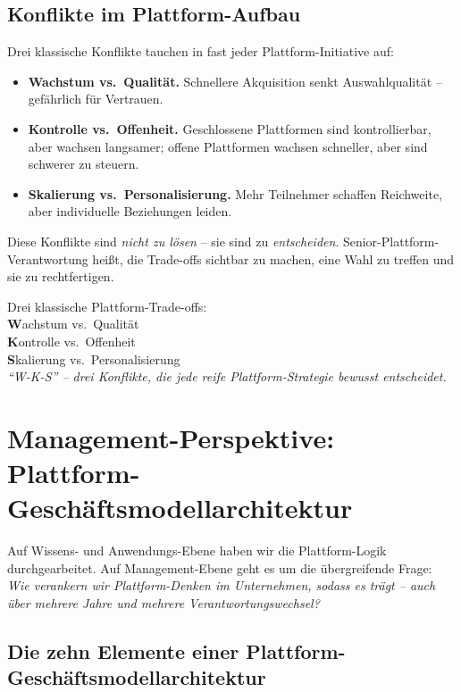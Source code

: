 \documentclass[11pt,a4paper,oneside]{article}
\newcommand{\caveatfontfallback}{\itshape}
\newcommand\caveatfont{\caveatfontfallback}%
\newcommand{\akzent}[1]{{\caveatfont\color{lpAmber}#1}}
\newcommand{\fachbegriff}[1]{\textbf{#1}}
\begin{document}
\subsection{Konflikte im Plattform-Aufbau}

Drei klassische Konflikte tauchen in fast jeder Plattform-Initiative auf:

\begin{itemize}
  \item \fachbegriff{Wachstum vs.\ Qualität.} Schnellere Akquisition senkt Auswahlqualität -- gefährlich für Vertrauen.
  \item \fachbegriff{Kontrolle vs.\ Offenheit.} Geschlossene Plattformen sind kontrollierbar, aber wachsen langsamer; offene Plattformen wachsen schneller, aber sind schwerer zu steuern.
  \item \fachbegriff{Skalierung vs.\ Personalisierung.} Mehr Teilnehmer schaffen Reichweite, aber individuelle Beziehungen leiden.
\end{itemize}

Diese Konflikte sind \emph{nicht zu lösen} -- sie sind zu \emph{entscheiden}. Senior-Plattform-Verantwortung heißt, die Trade-offs sichtbar zu machen, eine Wahl zu treffen und sie zu rechtfertigen.

\begin{eselsbox}[Eselsbrücke: \akzent{W-K-S}]
Drei klassische Plattform-Trade-offs:\\[2pt]
\textbf{W}achstum vs.\ Qualität\\
\textbf{K}ontrolle vs.\ Offenheit\\
\textbf{S}kalierung vs.\ Personalisierung\\[2pt]
\emph{``W-K-S'' -- drei Konflikte, die jede reife Plattform-Strategie bewusst entscheidet.}
\end{eselsbox}

\section{Management-Perspektive: Plattform-Geschäftsmodellarchitektur}

Auf Wissens- und Anwendungs-Ebene haben wir die Plattform-Logik durchgearbeitet. Auf Management-Ebene geht es um die übergreifende Frage: \emph{Wie verankern wir Plattform-Denken im Unternehmen, sodass es trägt -- auch über mehrere Jahre und mehrere Verantwortungswechsel?}

\subsection{Die zehn Elemente einer Plattform-Geschäftsmodellarchitektur}
\end{document}
